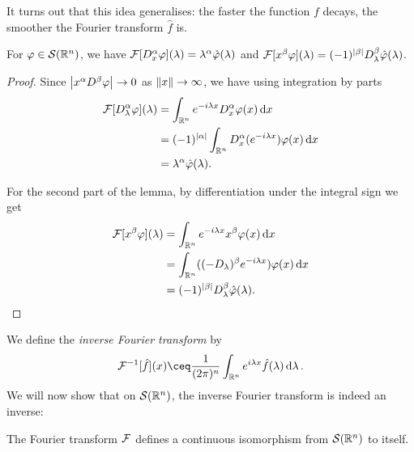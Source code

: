 It turns out that this idea generalises: the faster the function $f$ decays, the smoother the Fourier transform $\hat f$ is.  

\begin{lemma}
	For $\varphi \in \mathcal S(\mathbb R^n)$, we have $\mathcal F[D_x^\alpha \varphi](\lambda) = \lambda^\alpha \hat{\varphi}(\lambda)$ and $\mathcal F[x^\beta\varphi](\lambda) = (-1)^{\abs{\beta}} D_\lambda^\beta \hat{\varphi}(\lambda)$. 
\end{lemma}

\begin{proof}
	Since $\abs{x^\alpha D^\beta\varphi} \to 0$ as $\norm{x} \to \infty$, we have using integration by parts
	\begin{align*}
		\mathcal F[D_\lambda^\alpha\varphi](\lambda) &= \int_{\mathbb R^n} e^{-i\lambda x} D_x^\alpha \varphi(x) \dd{x} \\
		&= (-1)^{\abs{\alpha}} \int_{\mathbb R^n} D_x^\alpha(e^{-i\lambda x}) \varphi(x) \dd{x} \\
		&= \lambda^\alpha\hat{\varphi}(\lambda). 
	\end{align*}
	
	For the second part of the lemma, by differentiation under the integral sign we get
	\begin{align*}
		 \mathcal F[x^\beta \varphi](\lambda) &=  \int_{\mathbb R^n} e^{-i\lambda x} x^\beta \varphi(x) \dd{x} \\
		 &= \int_{\mathbb R^n} ((-D_\lambda)^\beta e^{-i\lambda x}) \varphi(x) \dd{x} \\
		 &= (-1)^{\abs{\beta}} D_\lambda^\beta \hat{\varphi}(\lambda).
	\end{align*}
\end{proof}


We define the \emph{inverse Fourier transform} by 
\[
\FF^{-1}[\hat f](x)  \ceq \frac{1}{(2\pi)^n} \int_{\RR^n} e^{i\lambda x} \hat f(\lambda) \dd{\lambda}. 
\]
We will now show that on $\mathcal S(\mathbb R^n)$, the inverse Fourier transform is indeed an inverse:
\begin{theorem}
	The Fourier transform $\mathcal F$ defines a continuous isomorphism from $\mathcal S(\mathbb R^n)$ to itself. 
\end{theorem}

